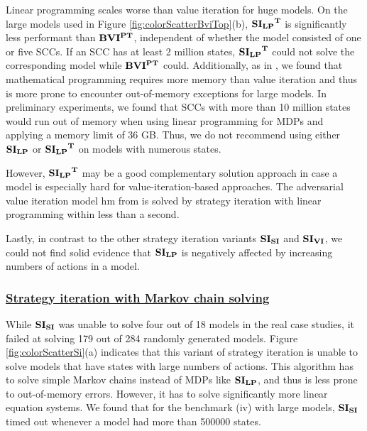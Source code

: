Linear programming scales worse than value iteration for huge models.
On the large models used in Figure \ref{fig:colorScatterBviTop}(b), $\mathbf{\mathbf{SI_{LP}}^T}$ is significantly less performant than $\mathbf{BVI^{PT}}$, independent of whether the model consisted of one or five SCCs.
If an SCC has at least 2 million states, $\mathbf{\mathbf{SI_{LP}}^T}$ could not solve the corresponding model while $\mathbf{BVI^{PT}}$ could.
Additionally, as in \cite{gandalf}, we found that mathematical programming requires more memory than value iteration and thus is more prone to encounter 
out-of-memory exceptions for large models. 
In preliminary experiments, we found that SCCs with more than 10 million states would run out of memory when using linear programming for MDPs and applying a memory limit of 36 GB.
Thus, we do not recommend using either $\mathbf{SI_{LP}}$ or $\mathbf{\mathbf{SI_{LP}}^T}$ on models with numerous states. 

However, $\mathbf{\mathbf{SI_{LP}}^T}$ may be a good complementary solution approach in case a model is especially hard for value-iteration-based approaches.
The adversarial value iteration model hm from \cite{haddadmonmege} is solved by strategy iteration with linear programming within less than a second.

Lastly, in contrast to the other strategy iteration variants $\mathbf{SI_{SI}}$ and $\mathbf{SI_{VI}}$, 
we could not find solid evidence that $\mathbf{SI_{LP}}$ is negatively affected by increasing numbers of actions in a model.


\subsubsection*{\underline{Strategy iteration with Markov chain solving}}
While $\mathbf{SI_{SI}}$ was unable to solve four out of 18 models in the real case studies, it failed at solving 179 out of 284 randomly generated models.
Figure \ref{fig:colorScatterSi}(a) indicates that this variant of strategy iteration is unable to solve models that have states with large numbers of actions.
This algorithm has to solve simple Markov chains instead of MDPs like $\mathbf{SI_{LP}}$, and thus is less prone to out-of-memory errors. 
However, it has to solve significantly more linear equation systems.
We found that for the benchmark (iv) with large models, $\mathbf{SI_{SI}}$ timed out whenever a model had more than 500000 states.

